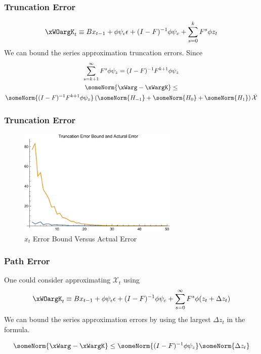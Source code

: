 \documentclass[notheorems]{beamer}
\begin{document}
\begin{frame}
  \frametitle{Truncation Error}
 	 \begin{gather}
 	 \xWOargK_t \equiv B x_{t-1}+ \phi \psi_\epsilon\epsilon  + (I - F)^{-1} \phi \psi_c + \sum_{s=0}^k F^s \phi z_{t}\label{theTruncSeries}
 \end{gather}
We can bound the  series approximation truncation errors.
Since
    \begin{gather}
      \label{eq:1}
\sum_{s=k+1}^{\infty} F^s \phi \psi_z = (I -F)^{-1} F^{k+1}\phi \psi_z       \\
\someNorm{\xWarg-\xWargK} \le\\ \someNorm{(I -F)^{-1} F^{k+1}\phi \psi_z} \left ( \someNorm{H_{-1} }+ \someNorm{H_{0} }+ \someNorm{H_{1} } \right )\bar{\mathcal{X}}
    \end{gather}

\end{frame}
\begin{frame}
  \frametitle{Truncation Error}


\begin{figure}
  \centering


\includegraphics[width=3in]{arbTruncErr.pdf}  
  \caption{$x_t$ Error Bound Versus Actual Error} \label{figArbTrunc}

\end{figure}

\end{frame}

\begin{frame}
  \frametitle{Path Error}
One could consider approximating $\mathcal{X}_t$ using
 	 \begin{gather}
 	 \xWOargK_t \equiv B x_{t-1}+ \phi \psi_\epsilon\epsilon  + (I - F)^{-1} \phi \psi_c + \sum_{s=0}^\infty F^s \phi (z_{t}+\Delta z_{t})\label{theDeltaSeries}
 \end{gather}
We can bound the  series approximation  errors by using the largest $\Delta z_t$ in the formula. 

    \begin{gather}
\someNorm{\xWarg-\xWargK} \le \someNorm{(I -F)^{-1} \phi \psi_z}  \someNorm{\Delta z_t } \label{pathErr}
    \end{gather}

\end{frame}
\end{document}
